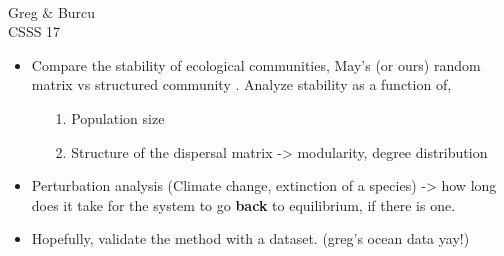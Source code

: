 \documentclass[12pt]{article}
\date{}
\begin{document}
\vspace*{0.2in}
\begin{flushleft}
{\Large
\textbf{} %
}
\newline
\\
Greg $\&$ Burcu
\\
\bigskip
CSSS 17
\\
\bigskip
\end{flushleft}

\begin{itemize}
\item Compare the stability of ecological communities, May's (or ours) random matrix vs structured community . Analyze stability as a function of,
\begin{itemize}
\item [1.] Population size 
\item [2.] Structure of the dispersal matrix -> modularity, degree distribution
\end{itemize}
\item Perturbation analysis (Climate change, extinction of a species) -> how long does it take for the system to go \textbf{back} to equilibrium, if there is one. 
\item Hopefully, validate the method with a dataset. (greg's ocean data yay!)
\end{itemize}
\end{document}
